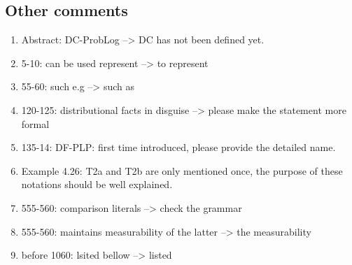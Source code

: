 \subsection{Other comments}

\begin{enumerate}
    \item Abstract: DC-ProbLog --> DC has not been defined yet.
    \\
    \item 5-10: can be used represent --> to represent
    \\
    \item 55-60: such e.g --> such as
    \\
    \item 120-125: distributional facts in disguise --> please make the statement more formal
    \\
    \item 135-14: DF-PLP: first time introduced, please provide the detailed name.
    \\
    \item Example 4.26: T2a and T2b are only mentioned once, the purpose of these notations should be well explained.
    \\
    \item 555-560: comparison literals --> check the grammar
    \\
    \item 555-560: maintains measurability of the latter --> the measurability
    \\
    \item before 1060: lsited bellow --> listed
    \\
\end{enumerate}







